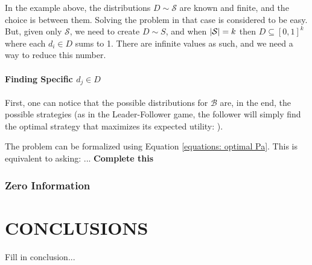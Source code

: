 \documentclass[a4paper,10pt]{article}
\newcommand{\B}{\ensuremath{\mathcal{B}}\xspace}
\DeclarePairedDelimiter\abs{\lvert}{\rvert}%
\begin{document}
In the example above, the distributions $D\sim \mathcal{S}$ are known and finite, and the choice is between them. Solving the problem in that case is considered to be easy.
But, given only $\mathcal{S}$, we need to create $D \sim S$, and when $\abs*{\mathcal{S}}=k$ then $D\subseteq[0,1]^{k}$ where each $d_i\in D$ sums to 1. There are infinite values as such, and we need a way to reduce this number.

\paragraph{Finding Specific $d_j\in D$}
First, one can notice that the possible distributions for \B are, in the end, the possible strategies (as in the Leader-Follower game, the follower will simply find the optimal strategy that maximizes its expected utility: \crbs).

The problem can be formalized using Equation \ref{equations: optimal Pa}. This is equivalent to asking: ... \textbf{Complete this}

\subsubsection{Zero Information}




\section{CONCLUSIONS}

Fill in conclusion...






\end{document}
